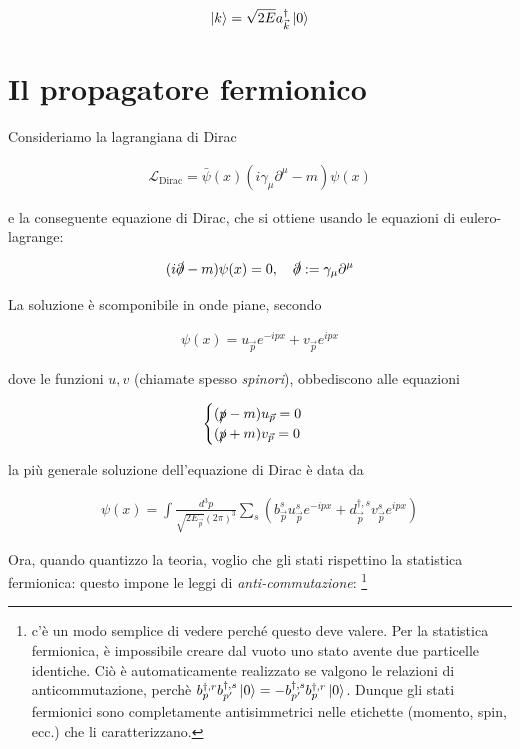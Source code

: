 \documentclass[11pt]{report}
\begin{document}
\begin{align}
    \ket{k} = \sqrt{2E}a^\dagger_{\vec{k}}\ket{0}
\end{align}

\section{Il propagatore fermionico}

Consideriamo la lagrangiana di Dirac 

\begin{align}
    \mathcal{L}_{\text{Dirac}} = \bar{\psi}(x)(i\gamma_\mu\partial^\mu -m)\psi(x)
\end{align}

e la conseguente equazione di Dirac, che si ottiene usando le equazioni di eulero-lagrange: 

\begin{align}
    (i\slashed{\partial} -m)\psi(x) =  0, \quad \slashed{\partial} := \gamma_\mu\partial^\mu
\end{align}

La soluzione è scomponibile in onde piane, secondo 

\begin{align}
    \psi(x) = u_{\vec{p}}e^{-ipx} + v_{\vec{p}}e^{ipx}
\end{align}

dove le funzioni \(u, v\) (chiamate spesso \emph{spinori}), obbediscono alle equazioni

\begin{align}
\begin{cases}
    (\slashed{p}-m)u_{\vec{p}} = 0 \\
    (\slashed{p}+m)v_{\vec{p}} = 0 
\end{cases}
\end{align}


la più generale soluzione dell'equazione di Dirac è data da 

\begin{align}
    \psi(x) = \int \frac{d^3p}{\sqrt{2E_{\vec{p}}}(2\pi)^3}\sum_s\left( b^s_{\vec{p}}u^s_{\vec{p}}e^{-ipx} + d^{\dagger, s}_{\vec{p}}v^s_{\vec{p}}e^{ipx} \right)
\end{align}

Ora, quando quantizzo la teoria, voglio che gli stati rispettino la statistica fermionica: questo impone le leggi di \emph{anti-commutazione}: \footnote{c'è un modo semplice di vedere perché questo deve valere. Per la statistica fermionica, è impossibile creare dal vuoto uno stato avente due particelle identiche. Ciò è automaticamente realizzato se valgono le relazioni di anticommutazione, perchè \(b^{\dagger, r}_p b^{\dagger, s}_{p'} \ket{0} = - b^{\dagger, s}_{p'} b^{\dagger, r}_p  \ket{0}\). Dunque gli stati fermionici sono completamente antisimmetrici nelle etichette (momento, spin, ecc.) che li caratterizzano. }
\end{document}
